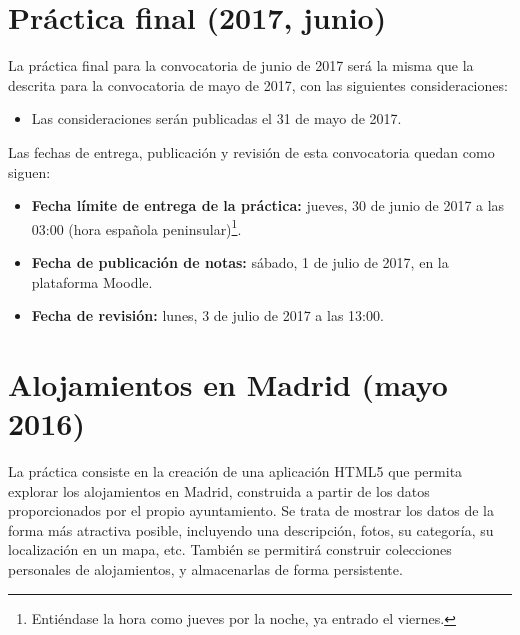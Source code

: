 \section{Práctica final (2017, junio)}
\label{practica-final-2017-06}

La práctica final para la convocatoria de junio de 2017 será la misma que la descrita para la convocatoria de mayo de 2017, con las siguientes consideraciones:

\begin{itemize}
  \item Las consideraciones serán publicadas el 31 de mayo de 2017.
\end{itemize}

Las fechas de entrega, publicación y revisión de esta convocatoria quedan como siguen:

\begin{itemize}
  \item \textbf{Fecha límite de entrega de la práctica:} jueves, 30 de junio de 2017 a las 03:00 (hora española peninsular)\footnote{Entiéndase la hora como jueves por la noche, ya entrado el viernes.}.

  \item \textbf{Fecha de publicación de notas:} sábado, 1 de julio de 2017, en la plataforma Moodle.

  \item \textbf{Fecha de revisión:} lunes, 3 de julio de 2017 a las 13:00.
\end{itemize}




\section{Alojamientos en Madrid (mayo 2016)}

\label{sec:final-16-mayo}

La práctica consiste en la creación de una aplicación HTML5 que permita explorar los alojamientos en Madrid, construida a partir de los datos proporcionados por el propio ayuntamiento. Se trata de mostrar los datos de la forma más atractiva posible, incluyendo una descripción, fotos, su categoría, su localización en un mapa, etc. También se permitirá construir colecciones personales de alojamientos, y almacenarlas de forma persistente.


